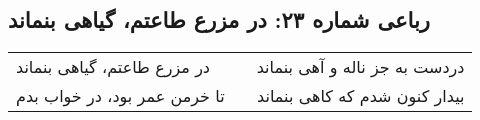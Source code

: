 \begin{center}
\section*{رباعی شماره ۲۳: در مزرع طاعتم، گیاهی بنماند}
\label{sec:023}
\begin{longtable}{l p{0.5cm} r}
در مزرع طاعتم، گیاهی بنماند
&&
دردست به جز ناله و آهی بنماند
\\
تا خرمن عمر بود، در خواب بدم
&&
بیدار کنون شدم که کاهی بنماند
\\
\end{longtable}
\end{center}
